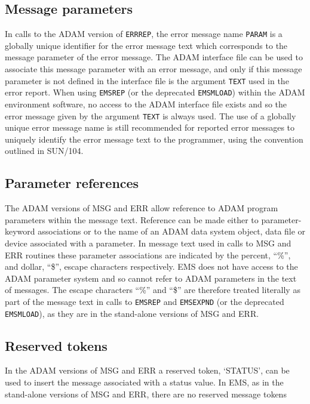 \documentclass[twoside,11pt]{article}
\newcommand{\xref}[3]{#1}
\newcommand{\xlabel}[1]{}
\renewcommand{\_}{\texttt{\symbol{95}}}
\begin{document}
\subsection{\xlabel{message_parameters}Message parameters}
In calls to the ADAM version of \texttt{ERR\_REP}, the error message name
\texttt{PARAM} is a 
globally unique identifier for the error message text which corresponds to
the message parameter of the error message.
The ADAM interface file can be used to associate this message parameter with
an error message, and only if this message parameter is not defined in the 
interface file is the argument \texttt{TEXT} used in the error report.
When using \texttt{EMS\_REP} (or the deprecated \texttt{EMS\_MLOAD}) within the
ADAM environment software, no access to the ADAM interface file exists and so
the error message given by the argument \texttt{TEXT} is always used.
The use of a globally unique error message name is still recommended for 
reported error messages to uniquely identify the error message text to the
programmer, using the convention outlined in 
\xref{SUN/104}{sun104}{reporting_errors}.

\subsection{\xlabel{parameter_references}Parameter references}
The ADAM versions of MSG and ERR allow reference to ADAM program
parameters within the message text. 
Reference can be made either to parameter-keyword associations or to the name
of an ADAM data system object, data file or device associated with a parameter.
In message text used in calls to MSG and ERR routines these parameter
associations are indicated by the percent, ``\%'', and dollar, ``\$'', escape
characters respectively.
EMS does not have access to the ADAM parameter system and so cannot refer
to ADAM parameters in the text of  messages.
The escape characters ``\%'' and ``\$'' are therefore treated literally as 
part of the message text in calls to \texttt{EMS\_REP} and \texttt{EMS\_EXPND}
(or the deprecated \texttt{EMS\_MLOAD}), as they are in the stand-alone
versions of MSG and ERR.

\subsection{\xlabel{reserved_tokens}Reserved tokens}
In the ADAM versions of MSG and ERR a reserved token, `STATUS', can be
used to insert the message associated with a status value.
In EMS, as in the stand-alone versions of MSG and ERR, there are no reserved
message tokens
\end{document}
